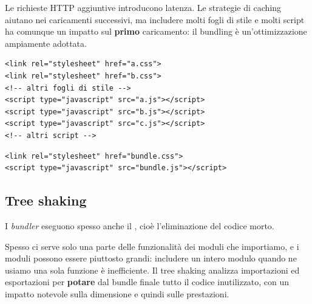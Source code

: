 Le richieste HTTP aggiuntive introducono latenza. Le strategie di caching
aiutano nei caricamenti successivi, ma includere molti fogli di stile e molti
script ha comunque un impatto sul \textbf{primo} caricamento: il bundling è
un'ottimizzazione ampiamente adottata.

\begin{affianco}[0.5]
\begin{lstlisting}[style=html, name=prima.html]
<link rel="stylesheet" href="a.css">
<link rel="stylesheet" href="b.css">
<!-- altri fogli di stile -->
<script type="javascript" src="a.js"></script>
<script type="javascript" src="b.js"></script>
<script type="javascript" src="c.js"></script>
<!-- altri script -->
\end{lstlisting}
\risultato
\begin{lstlisting}[style=html, name=dopo.html]
<link rel="stylesheet" href="bundle.css">
<script type="javascript" src="bundle.js"></script>
\end{lstlisting}
\end{affianco}



\subsection{Tree shaking}

I \textit{bundler} eseguono spesso anche il , cioè
l'eliminazione del codice morto.

Spesso ci serve solo una parte delle funzionalità dei moduli che importiamo, e i
moduli possono essere piuttosto grandi: includere un intero modulo quando ne
usiamo una sola funzione è inefficiente. Il tree shaking analizza importazioni ed
esportazioni per \textbf{potare} dal bundle finale tutto il codice inutilizzato,
con un impatto notevole sulla dimensione e quindi sulle prestazioni.

